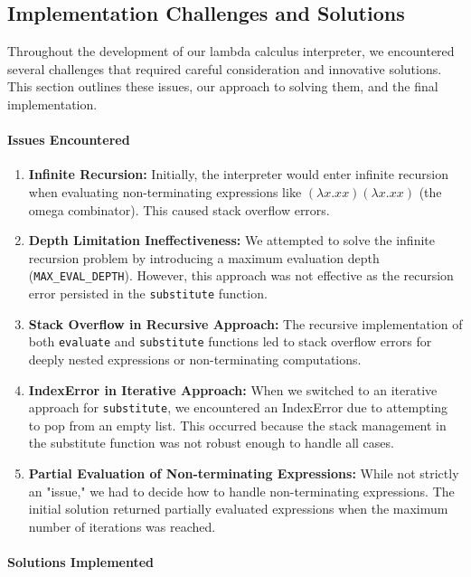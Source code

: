 \subsection{Implementation Challenges and Solutions}

Throughout the development of our lambda calculus interpreter, we encountered several challenges that required careful consideration and innovative solutions. This section outlines these issues, our approach to solving them, and the final implementation.

\paragraph{Issues Encountered}

\begin{enumerate}
    \item \textbf{Infinite Recursion:} Initially, the interpreter would enter infinite recursion when evaluating non-terminating expressions like $(\lambda x.x x) (\lambda x.x x)$ (the omega combinator). This caused stack overflow errors.
    \item \textbf{Depth Limitation Ineffectiveness:} We attempted to solve the infinite recursion problem by introducing a maximum evaluation depth (\texttt{MAX\_EVAL\_DEPTH}). However, this approach was not effective as the recursion error persisted in the \texttt{substitute} function.
    \item \textbf{Stack Overflow in Recursive Approach:} The recursive implementation of both \texttt{evaluate} and \texttt{substitute} functions led to stack overflow errors for deeply nested expressions or non-terminating computations.
    \item \textbf{IndexError in Iterative Approach:} When we switched to an iterative approach for \texttt{substitute}, we encountered an IndexError due to attempting to pop from an empty list. This occurred because the stack management in the substitute function was not robust enough to handle all cases.
    \item \textbf{Partial Evaluation of Non-terminating Expressions:} While not strictly an "issue," we had to decide how to handle non-terminating expressions. The initial solution returned partially evaluated expressions when the maximum number of iterations was reached.
\end{enumerate}

\paragraph{Solutions Implemented}

